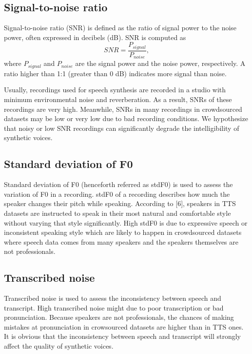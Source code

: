 \documentclass[12pt]{article}
\begin{document}
\subsection{Signal-to-noise ratio}
Signal-to-noise ratio (SNR) is defined as the ratio of signal power to the noise power, often expressed in decibels (dB). SNR is computed as
\begin{equation}\label{exp_SNR}
    SNR = \frac{P_{signal}}{P_{noise}},
\end{equation}
where $P_{signal}$ and $P_{noise}$ are the signal power and the noise power, respectively. A ratio higher than 1:1 (greater than 0 dB) indicates more signal than noise.

Usually, recordings used for speech synthesis are recorded in a studio with minimum environmental noise and reverberation. As a result, SNRs of these recordings are very high. Meanwhile, SNRs in many recordings in crowdsourced datasets may be low or very low due to bad recording conditions.
We hypothesize that noisy or low SNR recordings can significantly degrade the intelligibility of synthetic voices.

\subsection{Standard deviation of F0}
Standard deviation of F0 (henceforth referred as stdF0) is used to assess the variation of F0 in a recording. stdF0 of a recording describes how much the speaker changes their pitch while speaking. According to [6], speakers in TTS datasets are instructed to speak in their most natural and comfortable style without varying that style significantly. High stdF0 is due to expressive speech or inconsistent speaking style which are likely to happen in crowdsourced datasets where speech data comes from many speakers and the speakers themselves are not professionals.

\subsection{Transcribed noise}
Transcribed noise is used to assess the inconsistency between speech and transcript. High transcribed noise might due to poor transcription or bad pronunciation. Because speakers are not professionals, the chances of making mistakes at pronunciation in crowsourced datasets are higher than in TTS ones. It is obvious that the inconsistency between speech and transcript will strongly affect the quality of synthetic voices.
\end{document}

